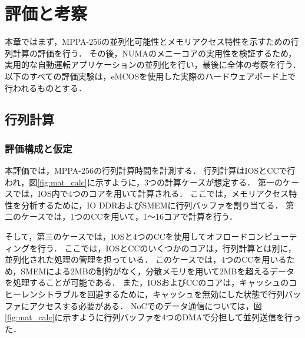 \documentclass[submit,techrep]{ipsj_v2/UTF8/ipsj}
\begin{document}
\section{評価と考察}
\label{sec:evaluations}
本章ではまず，MPPA-256の並列化可能性とメモリアクセス特性を示すための行列計算の評価を行う．
その後，NUMAのメニーコアの実用性を検証するため，実用的な自動運転アプリケーションの並列化を行い，最後に全体の考察を行う．
以下のすべての評価実験は，eMCOSを使用した実際のハードウェアボード上で行われるものとする．


\subsection{行列計算}
\label{sec:martix_eval}

\subsubsection{評価構成と仮定}
\label{sec:situations_and_assumptions}
本評価では，MPPA-256の行列計算時間を計測する．
行列計算はIOSとCCで行われ，図\ref{fig:mat_calc}に示すように，3つの計算ケースが想定する．
第一のケースでは，IOS内で4つのコアを用いて計算される．
ここでは，メモリアクセス特性を分析するために，IO DDRおよびSMEMに行列バッファを割り当てる．
第二のケースでは，1つのCCを用いて，1～16コアで計算を行う．

そして，第三のケースでは，IOSと4つのCCを使用してオフロードコンピューティングを行う．
ここでは，IOSとCCのいくつかのコアは，行列計算とは別に，並列化された処理の管理を担っている．
このケースでは，4つのCCを用いるため，SMEMによる2MBの制約がなく，分散メモリを用いて2MBを超えるデータを処理することが可能である．
また，IOSおよびCCのコアは，キャッシュのコヒーレンシトラブルを回避するために，キャッシュを無効にした状態で行列バッファにアクセスする必要がある．
NoCでのデータ通信については，図\ref{fig:mat_calc}に示すように行列バッファを4つのDMAで分担して並列送信を行った．
\end{document}
